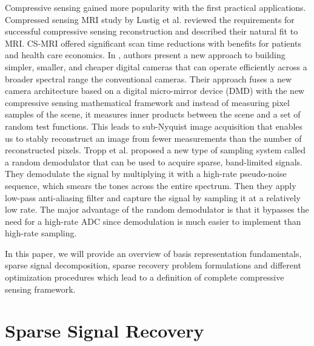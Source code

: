 \documentclass[journal]{IEEEtran}
\begin{document}
Compressive sensing gained more popularity with the first practical applications. Compressed sensing MRI study by Lustig et al. \cite{Lustig2008} reviewed the requirements for successful compressive sensing reconstruction and described their natural fit to MRI. CS-MRI offered significant scan time reductions with benefits for patients and health care economics. In \cite{duarte2008single}, authors present a new approach to building simpler, smaller, and cheaper digital cameras that can operate efficiently across a broader spectral range the conventional cameras. Their approach fuses a new camera architecture based on a digital micro-mirror device (DMD) with the new compressive sensing mathematical framework and instead of measuring pixel samples of the scene, it measures inner products between the scene and a set of random test functions. This leads to sub-Nyquist image acquisition that enables us to stably reconstruct an image from fewer measurements than the number of reconstructed pixels. Tropp et al. \cite{Tropp2010} proposed a new type of sampling system called a random demodulator that can be used to acquire sparse, band-limited signals. They demodulate the signal by multiplying it with a high-rate pseudo-noise sequence, which smears the tones across the entire spectrum. Then they apply low-pass anti-aliasing filter and capture the signal by sampling it at a relatively low rate. The major advantage of the random demodulator is that it bypasses the need for a high-rate ADC since demodulation is much easier to implement than high-rate sampling.

In this paper, we will provide an overview of basis representation fundamentals, sparse signal decomposition, sparse recovery problem formulations and different optimization procedures which lead to a definition of complete compressive sensing framework. 

\section{Sparse Signal Recovery}
\end{document}
